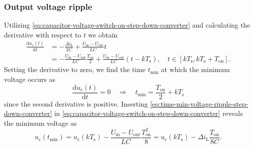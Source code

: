 \begin{frame}[fragile]
\begin{figure}
    \end{figure}
\end{frame}


\begin{frame}
    \frametitle{Output voltage ripple}
    Utilizing \eqref{eq:capacitor-voltage-switch-on-step-down-converter} and calculating the derivative with respect to $t$ we obtain
    \begin{equation}
        \begin{split}
            \frac{\mathrm{d}u_\mathrm{c}(t)}{\mathrm{d}t} &= -\frac{\Delta i_\mathrm{L}}{2 C} + \frac{U_\mathrm{in}-U_\mathrm{out}}{LC} t\\
                                                          &= -\frac{U_\mathrm{in}-U_\mathrm{out}}{LC}\frac{T_\mathrm{on}}{2} +\frac{U_\mathrm{in}-U_\mathrm{out}}{LC} (t-kT_\mathrm{s}), \quad t\in [k T_\mathrm{s}, k T_\mathrm{s} + T_\mathrm{on}].
        \end{split}
    \end{equation}
    Setting the derivative to zero, we find the time $t_\mathrm{min}$ at which the minimum voltage occurs as
    \begin{equation}
        \frac{\mathrm{d}u_\mathrm{c}(t)}{\mathrm{d}t} = 0 \quad \Rightarrow \quad t_\mathrm{min} = \frac{T_\mathrm{on}}{2} + kT_\mathrm{s}
        \label{eq:time-min-voltage-ripple-step-down-converter}
    \end{equation}
    since the second derivative is positive. Inserting \eqref{eq:time-min-voltage-ripple-step-down-converter} in \eqref{eq:capacitor-voltage-switch-on-step-down-converter} reveals the minimum voltage as
    \begin{equation}
        u_\mathrm{c}(t_\mathrm{min}) = u_\mathrm{c}(kT_\mathrm{s}) - \frac{U_\mathrm{in}-U_\mathrm{out}}{LC} \frac{T_\mathrm{on}^2}{8} = u_\mathrm{c}(kT_\mathrm{s}) - \Delta i_\mathrm{L}\frac{T_\mathrm{on}}{8C}.
    \end{equation}
\end{frame}

